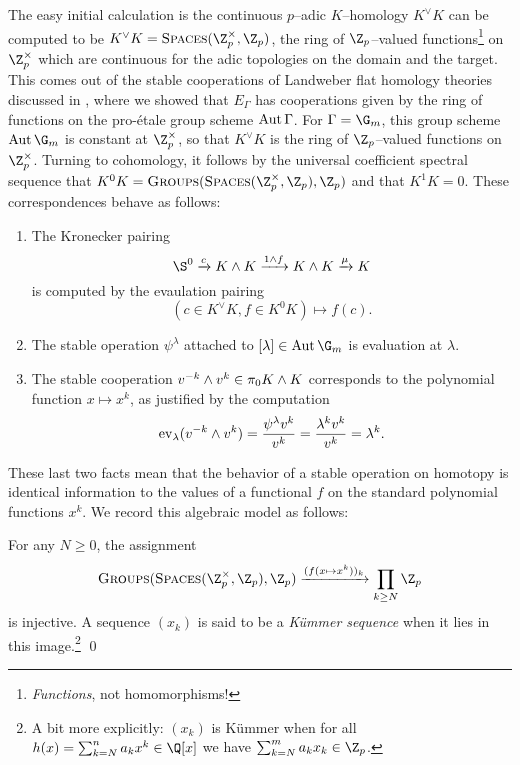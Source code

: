 The easy initial calculation is the continuous $p$--adic $K$--homology $K^\vee K$ can be computed to be $K^\vee K = \CatOf{Spaces}(\Z_p^\times, \Z_p)$, the ring of $\Z_p$--valued functions\footnote{\emph{Functions}, not homomorphisms!} on $\Z_p^\times$ which are continuous for the adic topologies on the domain and the target.  This comes out of the stable cooperations of Landweber flat homology theories discussed in , where we showed that $E_\Gamma$ has cooperations given by the ring of functions on the pro-\'etale group scheme $\operatorname{Aut} \Gamma$.  For $\Gamma = \G_m$, this group scheme $\Aut \G_m$ is constant at $\Z_p^\times$, so that $K^\vee K$ is the ring of $\Z_p$--valued functions on $\Z_p^\times$.  Turning to cohomology, it follows by the universal coefficient spectral sequence that $K^0 K = \CatOf{Groups}(\CatOf{Spaces}(\Z_p^\times, \Z_p), \Z_p)$ and that $K^1 K = 0$.  These correspondences behave as follows:
\begin{enumerate}
    \item The Kronecker pairing \[\S^0 \xrightarrow{c} K \sm K \xrightarrow{1 \sm f} K \sm K \xrightarrow{\mu} K\] is computed by the evaulation pairing \[(c \in K^\vee K, f \in K^0 K) \mapsto f(c).\]
    \item The stable operation $\psi^\lambda$ attached to $[\lambda] \in \Aut \G_m$ is evaluation at $\lambda$.
    \item The stable cooperation $v^{-k} \wedge v^k \in \pi_0 K \wedge K$ corresponds to the polynomial function $x \mapsto x^k$, as justified by the computation \[\operatorname{ev}_{\lambda}(v^{-k} \wedge v^k) = \frac{\psi^\lambda v^k}{v^k} = \frac{\lambda^k v^k}{v^k} = \lambda^k.\]
\end{enumerate}

\noindent These last two facts mean that the behavior of a stable operation on homotopy is identical information to the values of a functional $f$ on the standard polynomial functions $x^k$.  We record this algebraic model as follows:
\begin{lemma}
For any $N \ge 0$, the assignment \[\CatOf{Groups}(\CatOf{Spaces}(\Z_p^\times, \Z_p), \Z_p) \xrightarrow{(f(x \mapsto x^k))_k} \prod_{k \ge N} \Z_p\] is injective.  A sequence $(x_k)$ is said to be a \textit{K\"ummer sequence} when it lies in this image.\footnote{A bit more explicitly: $(x_k)$ is K\"ummer when for all $h(x) = \sum_{k=N}^n a_k x^k \in \Q[x]$ we have $\sum_{k=N}^m a_k x_k \in \Z_p$.} \qed
\end{lemma}

